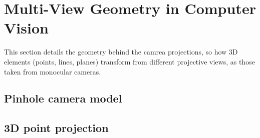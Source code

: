 \section{Multi-View Geometry in Computer Vision}
\label{sec:geometry_computer_vision}
This section details the geometry behind the camrea projections, so how 3D elements (points, lines, planes) transform from different projective views, as those taken from monocular cameras.

\subsection{Pinhole camera model}
\subsection{3D point projection}
